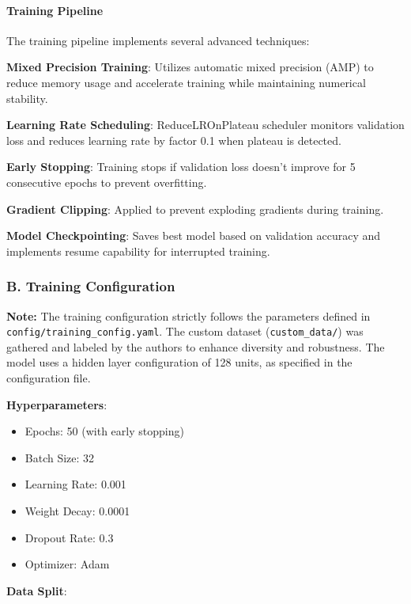 \documentclass[11pt,a4paper,twoside]{article}
\providecommand{\tightlist}{%
  \setlength{\itemsep}{0pt}\setlength{\parskip}{0pt}}
\begin{document}
\paragraph{Training Pipeline}\label{training-pipeline}

The training pipeline implements several advanced techniques:

\textbf{Mixed Precision Training}: Utilizes automatic mixed precision
(AMP) to reduce memory usage and accelerate training while maintaining
numerical stability.

\textbf{Learning Rate Scheduling}: ReduceLROnPlateau scheduler monitors
validation loss and reduces learning rate by factor 0.1 when plateau is
detected.

\textbf{Early Stopping}: Training stops if validation loss doesn't
improve for 5 consecutive epochs to prevent overfitting.

\textbf{Gradient Clipping}: Applied to prevent exploding gradients
during training.

\textbf{Model Checkpointing}: Saves best model based on validation
accuracy and implements resume capability for interrupted training.

\subsubsection{B. Training Configuration}\label{b.-training-configuration}

\textbf{Note:} The training configuration strictly follows the parameters defined in \\ \texttt{config/training\_config.yaml}. The custom dataset (\texttt{custom\_data/}) was gathered and labeled by the authors to enhance diversity and robustness. The model uses a hidden layer configuration of 128 units, as specified in the configuration file.

\textbf{Hyperparameters}:

\begin{itemize}
\tightlist
\item
  Epochs: 50 (with early stopping)
\item
  Batch Size: 32
\item
  Learning Rate: 0.001
\item
  Weight Decay: 0.0001
\item
  Dropout Rate: 0.3
\item
  Optimizer: Adam
\end{itemize}

\textbf{Data Split}:
\end{document}
